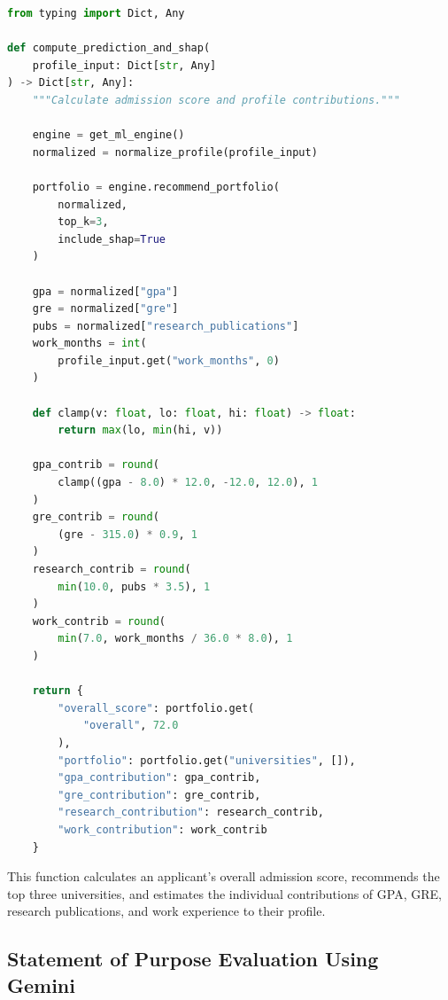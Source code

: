 \begin{lstlisting}[language=Python]
from typing import Dict, Any

def compute_prediction_and_shap(
    profile_input: Dict[str, Any]
) -> Dict[str, Any]:
    """Calculate admission score and profile contributions."""

    engine = get_ml_engine()
    normalized = normalize_profile(profile_input)

    portfolio = engine.recommend_portfolio(
        normalized,
        top_k=3,
        include_shap=True
    )

    gpa = normalized["gpa"]
    gre = normalized["gre"]
    pubs = normalized["research_publications"]
    work_months = int(
        profile_input.get("work_months", 0)
    )

    def clamp(v: float, lo: float, hi: float) -> float:
        return max(lo, min(hi, v))

    gpa_contrib = round(
        clamp((gpa - 8.0) * 12.0, -12.0, 12.0), 1
    )
    gre_contrib = round(
        (gre - 315.0) * 0.9, 1
    )
    research_contrib = round(
        min(10.0, pubs * 3.5), 1
    )
    work_contrib = round(
        min(7.0, work_months / 36.0 * 8.0), 1
    )

    return {
        "overall_score": portfolio.get(
            "overall", 72.0
        ),
        "portfolio": portfolio.get("universities", []),
        "gpa_contribution": gpa_contrib,
        "gre_contribution": gre_contrib,
        "research_contribution": research_contrib,
        "work_contribution": work_contrib
    }
\end{lstlisting}
This function calculates an applicant’s overall admission score, recommends the top three universities, and estimates the individual contributions of GPA, GRE, research publications, and work experience to their profile.

\clearpage
\subsection{Statement of Purpose Evaluation Using Gemini}


